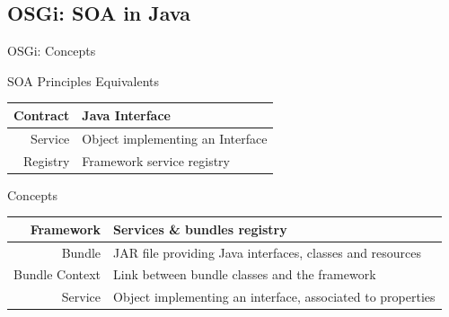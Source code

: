 \subsection{OSGi: SOA in Java}

\begin{frame}{OSGi: Concepts}
\begin{block}{SOA Principles Equivalents}
\begin{center}
\begin{tabular}{rp{}}
Contract & Java Interface\\
\hline
Service & Object implementing an Interface\\
\hline
Registry & Framework service registry\\
\end{tabular}
\end{center}
\end{block}

\begin{block}{Concepts}
\begin{center}
\begin{tabular}{rp{}}
Framework & Services \& bundles registry\\
\hline
Bundle & JAR file providing Java interfaces, classes and resources\\
\hline
Bundle Context & Link between bundle classes and the framework\\
\hline
Service & Object implementing an interface, associated to properties\\
\end{tabular}
\end{center}
\end{block}
\end{frame}

